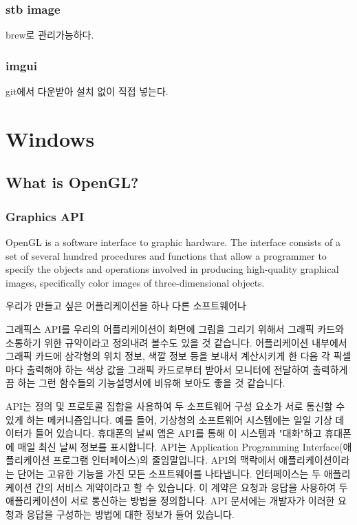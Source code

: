 \documentclass[a4paper]{report}
\begin{document}
\subsection{stb image}
brew로 관리가능하다.

\subsection{imgui}
git에서 다운받아 설치 없이 직접 넣는다.










\chapter{Windows}

\section{What is OpenGL?}

\subsection{Graphics API}

OpenGL is a software interface to graphic hardware. The interface consists of a set of several hundred procedures and functions that allow a programmer to specify the objects and operations involved in producing high-quality graphical images, specifically color images of three-dimensional objects.

우리가 만들고 싶은 어플리케이션을 하나 
다른 소프트웨어나 

그래픽스 API를 우리의 어플리케이션이 화면에 그림을 그리기 위해서 그래픽 카드와 소통하기 위한 규약이라고 정의내려 볼수도 있을 것 같습니다. 어플리케이션 내부에서 그래픽 카드에 삼각형의 위치 정보, 색깔 정보 등을 보내서 계산시키게 한 다음 각 픽셀마다 출력해야 하는 색상 값을 그래픽 카드로부터 받아서 모니터에 전달하여 출력하게끔 하는 그런 함수들의 기능설명서에 비유해 보아도 좋을 것 같습니다.

	API는 정의 및 프로토콜 집합을 사용하여 두 소프트웨어 구성 요소가 서로 통신할 수 있게 하는 메커니즘입니다. 예를 들어, 기상청의 소프트웨어 시스템에는 일일 기상 데이터가 들어 있습니다. 휴대폰의 날씨 앱은 API를 통해 이 시스템과 "대화"하고 휴대폰에 매일 최신 날씨 정보를 표시합니다.
	API는 Application Programming Interface(애플리케이션 프로그램 인터페이스)의 줄임말입니다. API의 맥락에서 애플리케이션이라는 단어는 고유한 기능을 가진 모든 소프트웨어를 나타냅니다. 인터페이스는 두 애플리케이션 간의 서비스 계약이라고 할 수 있습니다. 이 계약은 요청과 응답을 사용하여 두 애플리케이션이 서로 통신하는 방법을 정의합니다. API 문서에는 개발자가 이러한 요청과 응답을 구성하는 방법에 대한 정보가 들어 있습니다.
\end{document}

